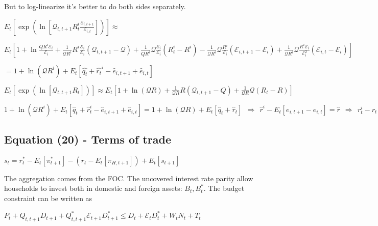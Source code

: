 \documentclass[
]{article}
\begin{document}
But to log-linearize it's better to do both sides separately.

\(\displaystyle E_t \left[\exp \left( \ln \left[ \mathcal{Q}_{t,t+1} R_t^i \frac{\mathcal{E}_{i,t+1} }{\mathcal{E}_{i,t} }\right] \right) \right] \approx\)

\(\displaystyle E_t \left[ 1 + \ln\frac{Q R^i \mathcal{E}_{i}}{\mathcal{E}_{i}}+\frac{1}{\mathcal{Q}R^i}R^i \frac{ \mathcal{E}_{i}}{\mathcal{E}_{i}}(\mathcal{Q}_{t,t+1}-\mathcal{Q}) + \frac{1}{QR^i}\mathcal{Q} \frac{ \mathcal{E}_{i}}{\mathcal{E}_{i}}(R_t^i-R^i) - \frac{1}{\mathcal{Q}R^i}\mathcal{Q} \frac{R^i}{\mathcal{E}_{i}}(\mathcal{E}_{i,t+1}-\mathcal{E}_i) + \frac{1}{\mathcal{Q}R^i}\mathcal{Q} \frac{R^i \mathcal{E}_{i}}{\mathcal{E}_{i}^2}(\mathcal{E}_{i,t}-\mathcal{E}_i) \right]\)

\(\displaystyle = 1+ \ln(\mathcal{Q}R^i) + E_t \left[ \hat{q_t}+\hat{r_t}^i - \hat{e}_{i,t+1}+\hat{e}_{i,t}\right]\)

\(\displaystyle E_t \left[\exp \left( \ln \left[ \mathcal{Q}_{t,t+1} R_t \right] \right) \right] \approx E_t \left[ 1 + \ln(\mathcal{Q}R) +\frac{1}{\mathcal{Q}R}R (\mathcal{Q}_{t,t+1}-Q) +\frac{1}{\mathcal{Q}R} \mathcal{Q} (R_t-R)\right]\)

\(\displaystyle 1+ \ln(\mathcal{Q}R^i) + E_t \left[ \hat{q}_t+\hat{r}_t^i - \hat{e}_{i,t+1} + \hat{e}_{i,t}\right] = 1 + \ln(\mathcal{Q}R) + E_t \left[ \hat{q}_t + \hat{r}_t \right] \ \ \Rightarrow \ \ \hat{r}^i - E_t \left[ e_{i,t+1}-e_{i,t}\right] = \hat{r} \ \ \Rightarrow \ \ r_t^i-r_t=E_t[\Delta e_{i,t+1}]\)

\vspace{12pt}

\hypertarget{equation-20---terms-of-trade}{%
\subsection{Equation (20) - Terms of
trade}\label{equation-20---terms-of-trade}}

\(s_t =r_t^*-E_t[\pi_{t+1}^*] - (r_t-E_t[\pi_{H,t+1}])+E_t[s_{t+1}]\)

\vspace{8pt}

The aggregation comes from the FOC. The uncovered interest rate parity
allow households to invest both in domestic and foreign assets:
\(B_t, B_t^*\). The budget constraint can be written as

\(P_t + Q_{t,t+1}D_{t+1}+Q_{t,t+1}^*\mathcal{E}_{t+1}D_{t+1}^* \leq D_t+\mathcal{E}_{t}D_t^*+W_tN_t+T_t\)
\end{document}
